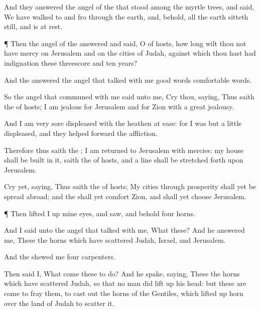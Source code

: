 {And they
answered the
angel of the
{} that
stood among the myrtle
trees, and
said, We have walked to and
fro through the
earth, and, behold, all the
earth sitteth
still, and is at
rest.


\par }{\PP {}¶ Then the
angel of the
{}
answered and
said, O
{} of
hosts, how long wilt thou not have
mercy on
Jerusalem and on the
cities of
Judah, against which thou hast had
indignation these threescore and
ten
years?

And the
{}
answered the
angel that
talked with me
{}
good
words
{}
comfortable
words.

So the
angel that
communed with me
said unto me,
Cry thou,
saying, Thus
saith the
{} of
hosts; I am
jealous for
Jerusalem and for
Zion with a
great
jealousy.

And I am
very
sore
displeased with the
heathen
{} at
ease: for I was but a
little
displeased, and they
helped forward the
affliction.

Therefore thus
saith the
{}; I am
returned to
Jerusalem with
mercies: my
house shall be
built in it,
saith the
{} of
hosts, and a
line shall be stretched
forth upon
Jerusalem.

Cry yet,
saying, Thus
saith the
{} of
hosts; My
cities through
prosperity shall yet be spread
abroad; and the
{} shall yet
comfort
Zion, and shall yet
choose
Jerusalem.


\par }{\PP {}¶ Then lifted I
up mine
eyes, and
saw, and behold
four
horns.

And I
said unto the
angel that
talked with me, What
{} these? And he
answered me, These
{} the
horns which have
scattered
Judah,
Israel, and
Jerusalem.

And the
{}
shewed me
four
carpenters.

Then
said I, What
come these to
do? And he
spake,
saying, These
{} the
horns which have
scattered
Judah, so
that no
man did lift
up his
head: but these are
come to
fray them, to cast
out the
horns of the
Gentiles, which lifted
up
{}
horn over the
land of
Judah to
scatter it.




\par }
